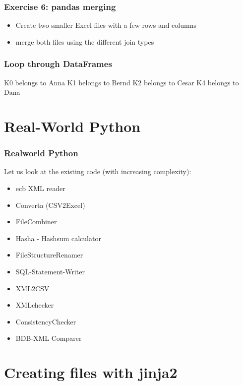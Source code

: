 \documentclass[ngerman]{beamer}
\begin{document}
\begin{frame}
\frametitle{Exercise 6: pandas merging}

\begin{itemize}
\item Create two smaller Excel files with a few rows and columns
\item merge both files using the different join types
\end{itemize}
\end{frame}

\begin{frame}[containsverbatim]
\frametitle{Loop through DataFrames}



\begin{ausgabe}
K0 belongs to Anna
K1 belongs to Bernd
K2 belongs to Cesar
K4 belongs to Dana
\end{ausgabe}
\end{frame}



\section{Real-World Python}

\begin{frame}
\frametitle{Realworld Python}

Let us look at the existing code (with increasing complexity):\vspace*{1em}

\begin{itemize}
\item ecb XML reader
\item Converta (CSV2Excel)
\item FileCombiner
\item Hasha - Hashsum calculator
\item FileStructureRenamer
\item SQL-Statement-Writer
\item XML2CSV
\item XMLchecker
\item ConsistencyChecker
\item BDB-XML Comparer
\end{itemize}
\end{frame}

\section{Creating files with jinja2}
\end{document}
